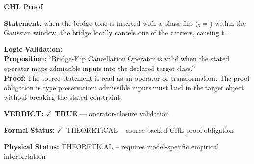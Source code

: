 \vspace{0.45em}
\noindent\textbf{CHL Proof}\par
\textbf{Statement:} when the bridge tone is inserted with a phase flip (₃ = ) within the Gaussian
window, the bridge locally cancels one of the carriers, causing t...

\textbf{Logic Validation:}\\
\textbf{Proposition:} ``Bridge-Flip Cancellation Operator is valid when the stated operator maps admissible
inputs into the declared target class.''\\
\textbf{Proof:} The source statement is read as an operator or transformation. The proof obligation is
type preservation: admissible inputs must land in the target object without breaking the
stated constraint.

\textbf{VERDICT:} \ensuremath{\checkmark}\ \textbf{TRUE} --- operator-closure validation

\textbf{Formal Status:} \ensuremath{\checkmark}\ THEORETICAL -- source-backed CHL proof obligation

\textbf{Physical Status:} THEORETICAL -- requires model-specific empirical interpretation
\par\vspace{0.45em}
\par
\ifTZPDarkEdition
{}
\fi
\endgroup
\endgroup
